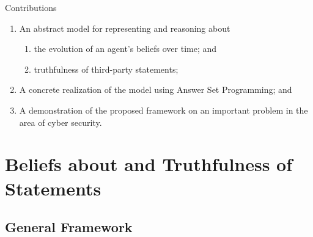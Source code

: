 \documentclass[unknownkeysallowed]{beamer}
\begin{document}
\begin{frame}{Contributions}


\begin{enumerate}
\item An abstract model for representing and reasoning about 
\begin{enumerate}
\item the evolution of an agent's beliefs over time; and 
\item truthfulness of third-party statements;   
\end{enumerate}
\item A concrete realization of the model using
Answer Set Programming; and
\item A demonstration of the proposed framework on an important problem in the
        area of  cyber security. 
\end{enumerate}

%
 
\end{frame} 
 
\section{Beliefs about and Truthfulness of Statements}

\subsection*{General Framework}
\end{document}

